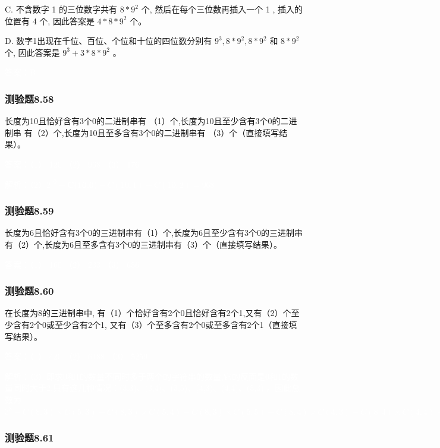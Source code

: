 \documentclass[UTF8, heading=true]{ctexart}
\begin{document}
C. 不含数字 1 的三位数字共有 $8 * 9^2$ 个, 然后在每个三位数再插入一个 1 , 插入的位置有 4 个, 因此答案是 $4 * 8 * 9^2$ 个。

D. 数字1出现在千位、百位、个位和十位的四位数分别有 $9^3, 8 * 9^2, 8 * 9^2$ 和 $8 * 9^2$ 个, 因此答案是 $9^3+3 * 8 * 9^2$ 。

\textcolor{white}{答案：B}

\subsubsection{测验题8.58}

长度为10且恰好含有3个0的二进制串有
（1）个,长度为10且至少含有3个0的二进制串
有（2）个,长度为10且至多含有3个0的二进制串有
（3）个（直接填写结果）。

\textcolor{white}{答案：（1） 120 （2） 968 （3） 176}

\textcolor{white}{解析：（2）$2^{10}-\textbf{C(10,0)}-C(10,1)-C(10,2)=968$}

\subsubsection{测验题8.59}

长度为6且恰好含有3个0的三进制串有（1）个,长度为6且至少含有3个0的三进制串有（2）个,长度为6且至多含有3个0的三进制串有（3）个（直接填写结果）。

\textcolor{white}{答案：（1） 160 （2） 233 （3） 656}

\subsubsection{测验题8.60}

在长度为8的三进制串中,
有（1）个恰好含有2个0且恰好含有2个1,又有（2）个至少含有2个0或至少含有2个1,
又有（3）个至多含有2个0或至多含有2个1（直接填写结果）。

\textcolor{white}{答案：（1） 420 （2） 6488 （3） 5259}

\textcolor{white}{解析：（3）即求0和1的数量不同时多于两个的字符串的数量,它的反面是0和1的数量同时大于2,只有这几种情况：(3,3)、(3,4)、(3,5)、(4,3)、(4,4)、(5,3)
。因此总数为$3^8-C(8,3)\times C(5,3)-C(8,3)\times C(5,4)-C(8,3)\times C(5,5)-C(8,4)\times C(4,3)-C(8,4)\times C(4,4)-C(8,5)\times C(3,3)=5259$}


\subsubsection{测验题8.61}
\end{document}
